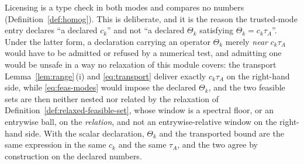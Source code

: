 
\begin{remark}\label{rem:scalar-declaration}
Licensing is a type check in both modes and compares no numbers
(Definition~\ref{def:homog}). This is deliberate, and it is the reason the
trusted-mode entry declares ``a declared $c_k$'' and not ``a declared
$\Theta_k$ satisfying $\Theta_k=c_k\tau_A$''. Under the latter form, a
declaration carrying an operator $\Theta_k$ merely \emph{near} $c_k\tau_A$
would have to be admitted or refused by a numerical test, and admitting one
would be unsafe in a way no relaxation of this module covers: the transport
Lemma~\ref{lem:range}\,(i) and \eqref{eq:transport} deliver exactly
$c_k\tau_A$ on the right-hand side, while \eqref{eq:feas-modes} would impose
the declared $\Theta_k$, and the two feasible sets are then neither nested nor
related by the relaxation of Definition~\ref{def:relaxed-feasible-set}, whose
window is a spectral floor, or an entrywise ball, on the \emph{relation}, and
not an entrywise-relative window on the right-hand side. With the scalar
declaration, $\Theta_k$ and the transported bound are the same expression in
the same $c_k$ and the same $\tau_A$, and the two agree by construction on the
declared numbers.
\end{remark}
